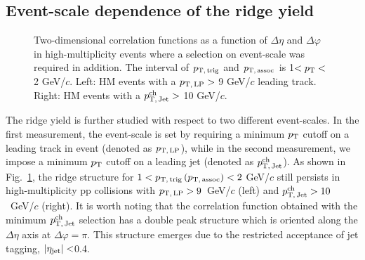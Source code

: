 \subsection{Event-scale dependence of the ridge yield}
\begin{figure}[h!]
	\centering
	\caption{ Two-dimensional correlation functions as a function of $\Delta\eta$ and $\Delta\varphi$ in high-multiplicity events where a selection on event-scale was required in addition. The interval of $p_\mathrm{T,\,trig}$ and $p_\mathrm{T,\,assoc}$ is 1$<p_\mathrm{T}<$2 GeV/$c$. Left: HM events with a $p_\mathrm{T,\,LP}>$ 9 GeV/$c$ leading track. Right: HM events with a $p_\mathrm{T,\,Jet}^\mathrm{ch}>$ 10 GeV/$c$.}
	\label{fig:PlotCorrHMTSel}
\end{figure}

The ridge yield is further studied with respect to two different event-scales. In the first measurement, the event-scale is set by requiring a minimum $p_\mathrm{T}$ cutoff on a leading track in event (denoted as $p_\mathrm{T,\,LP}$), while in the second measurement, we impose a minimum $p_\mathrm{T}$ cutoff on a leading jet (denoted as $p_\mathrm{T,\,Jet}^\mathrm{ch}$). As shown in Fig.~\ref{fig:PlotCorrHMTSel}, the ridge structure for $1< p_\mathrm{T,\,trig}\,(p_\mathrm{T,\,assoc}) <2$ GeV/$c$ still persists in high-multiplicity pp collisions with $p_\mathrm{T,\,LP}>9$~GeV/$c$ (left) and $p_\mathrm{T,\,Jet}^\mathrm{ch}>10$~GeV/$c$ (right).  %
It is worth noting that the correlation function obtained with the minimum $p_\mathrm{T,\,Jet}^\mathrm{ch}$ selection has a double peak structure which is oriented along the $\Delta\eta$ axis at $\Delta\varphi=\pi$. This structure emerges due to the restricted acceptance of jet tagging, $|\eta_{\rm{jet}}|<$0.4.

